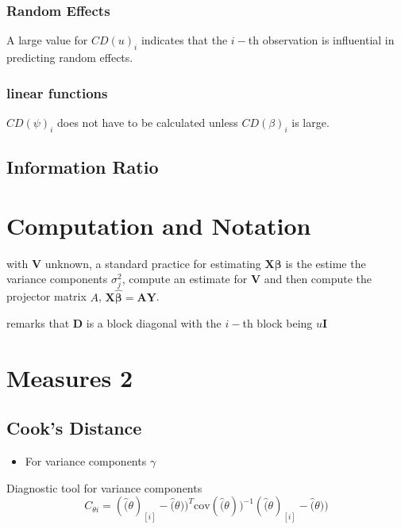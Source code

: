 \documentclass[12pt, a4paper]{report}
\theoremstyle{plain}
\theoremstyle{definition}
\theoremstyle{remark}
\begin{document}
\newpage
\subsubsection{Random Effects}

A large value for $CD(u)_i$ indicates that the $i-$th observation is influential in predicting random effects.

\subsubsection{linear functions}

$CD(\psi)_i$ does not have to be calculated unless $CD(\beta)_i$ is large.


\subsection{Information Ratio}


\newpage
\section{Computation and Notation } %
with $\boldsymbol{V}$ unknown, a standard practice for estimating $\boldsymbol{X \beta}$ is the estime the variance components $\sigma^2_j$,
compute an estimate for $\boldsymbol{V}$ and then compute the projector matrix $A$, $\boldsymbol{X \hat{\beta}}  = \boldsymbol{AY}$.


\citet{zewotir} remarks that $\boldsymbol{D}$ is a block diagonal with the $i-$th block being $u \boldsymbol{I}$
\newpage
\section{Measures 2} %

\subsection{Cook's Distance} %
\begin{itemize}
	\item For variance components $\gamma$
\end{itemize}

Diagnostic tool for variance components
\[ C_{\theta i} =(\hat(\theta)_{[i]} - \hat(\theta))^{T}\mbox{cov}( \hat(\theta))^{-1}(\hat(\theta)_{[i]} - \hat(\theta))\]
\end{document}
